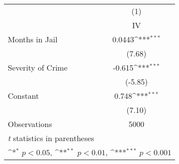 {
\def\sym#1{\ifmmode^{#1}\else\(^{#1}\)\fi}
\begin{tabular}{l*{1}{c}}
\hline\hline
                    &\multicolumn{1}{c}{(1)}\\
                    &\multicolumn{1}{c}{IV}\\
\hline
Months in Jail      &      0.0443\sym{***}\\
                    &      (7.68)         \\
[1em]
Severity of Crime   &      -0.615\sym{***}\\
                    &     (-5.85)         \\
[1em]
Constant            &       0.748\sym{***}\\
                    &      (7.10)         \\
\hline
Observations        &        5000         \\
\hline\hline
\multicolumn{2}{l}{\footnotesize \textit{t} statistics in parentheses}\\
\multicolumn{2}{l}{\footnotesize \sym{*} \(p<0.05\), \sym{**} \(p<0.01\), \sym{***} \(p<0.001\)}\\
\end{tabular}
}
